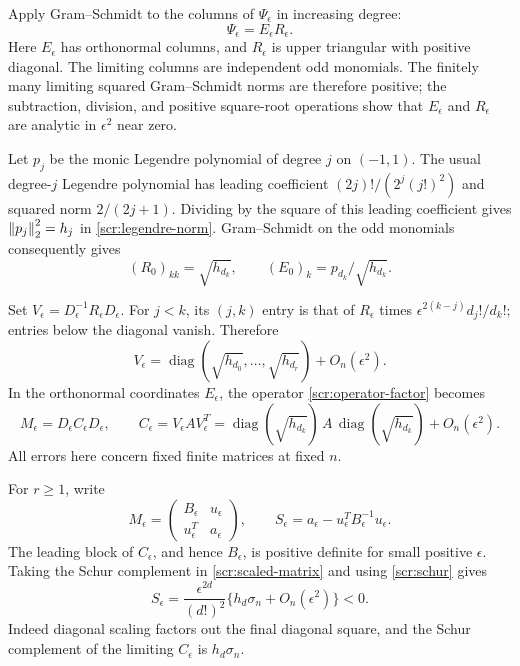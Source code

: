 Apply Gram--Schmidt to the columns of \(\Psi_\epsilon\) in
increasing degree:
\[
 \Psi_\epsilon=E_\epsilon R_\epsilon.
\]
Here \(E_\epsilon\) has orthonormal columns, and
\(R_\epsilon\) is upper triangular with positive diagonal.
The limiting columns are independent odd monomials. The finitely
many limiting squared Gram--Schmidt norms are therefore positive;
the subtraction, division, and positive square-root operations
show that \(E_\epsilon\) and \(R_\epsilon\) are analytic in
\(\epsilon^2\) near zero.

Let \(p_j\) be the monic Legendre polynomial of degree \(j\)
on \((-1,1)\). The usual degree-\(j\) Legendre polynomial has
leading coefficient \((2j)!/(2^j(j!)^2)\) and squared norm
\(2/(2j+1)\). Dividing by the square of this leading coefficient
gives \(\left\|p_j\right\|_2^2=h_j\) in
\eqref{scr:legendre-norm}. Gram--Schmidt on the odd monomials
consequently gives
\[
 (R_0)_{kk}=\sqrt{h_{d_k}},\qquad
 (E_0)_k=p_{d_k}/\sqrt{h_{d_k}}.
\]

Set \(V_\epsilon=D_\epsilon^{-1}R_\epsilon D_\epsilon\).
For \(j<k\), its \((j,k)\) entry is that of \(R_\epsilon\)
times \(\epsilon^{2(k-j)}d_j!/d_k!\); entries below the
diagonal vanish. Therefore
\[
 V_\epsilon=
   \operatorname{diag}(\sqrt{h_{d_0}},\ldots,\sqrt{h_{d_r}})
       +O_n(\epsilon^2).
\]
In the orthonormal coordinates \(E_\epsilon\), the operator
\eqref{scr:operator-factor} becomes
\begin{equation}\label{scr:scaled-matrix}
 M_\epsilon=D_\epsilon C_\epsilon D_\epsilon,\qquad
 C_\epsilon=V_\epsilon A V_\epsilon^T
   =\operatorname{diag}(\sqrt{h_{d_k}})\,
       A\,\operatorname{diag}(\sqrt{h_{d_k}})
           +O_n(\epsilon^2).
\end{equation}
All errors here concern fixed finite matrices at fixed \(n\).

For \(r\ge1\), write
\[
 M_\epsilon=
   \begin{pmatrix}B_\epsilon&u_\epsilon\\
                   u_\epsilon^T&a_\epsilon\end{pmatrix},
 \qquad
 S_\epsilon=a_\epsilon-u_\epsilon^TB_\epsilon^{-1}u_\epsilon.
\]
The leading block of \(C_\epsilon\), and hence \(B_\epsilon\),
is positive definite for small positive \(\epsilon\).
Taking the Schur complement in \eqref{scr:scaled-matrix} and
using \eqref{scr:schur} gives
\begin{equation}\label{scr:scaled-schur}
 S_\epsilon=
   \frac{\epsilon^{2d}}{(d!)^2}
          \{h_d\sigma_n+O_n(\epsilon^2)\}<0.
\end{equation}
Indeed diagonal scaling factors out the final diagonal square,
and the Schur complement of the limiting \(C_\epsilon\)
is \(h_d\sigma_n\).

